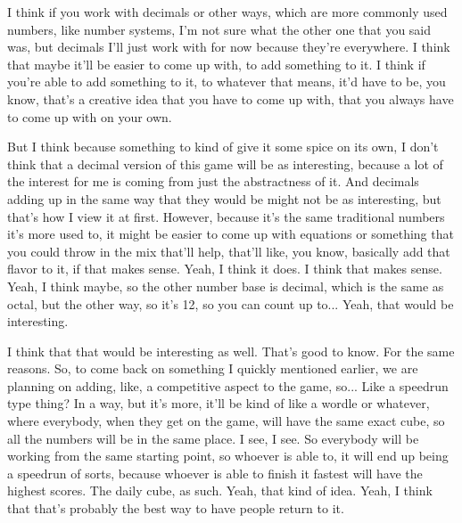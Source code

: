 \documentclass{article}
\begin{document}
I think if you work with decimals or other ways, which are more commonly used numbers, like
number systems, I'm not sure what the other one that you said was, but decimals I'll just work
with for now because they're everywhere. I think that maybe it'll be easier to come up with, to add
something to it. I think if you're able to add something to it, to whatever that means, it'd have to
be, you know, that's a creative idea that you have to come up with, that you always have to come
up with on your own.

But I think because something to kind of give it some spice on its own, I don't think that a decimal
version of this game will be as interesting, because a lot of the interest for me is coming from just
the abstractness of it. And decimals adding up in the same way that they would be might not be
as interesting, but that's how I view it at first. However, because it's the same traditional numbers
it's more used to, it might be easier to come up with equations or something that you could throw
in the mix that'll help, that'll like, you know, basically add that flavor to it, if that makes sense.
Yeah, I think it does. I think that makes sense. Yeah, I think maybe, so the other number base is
decimal, which is the same as octal, but the other way, so it's 12, so you can count up to... Yeah,
that would be interesting.

I think that that would be interesting as well. That's good to know. For the same reasons.
So, to come back on something I quickly mentioned earlier, we are planning on adding, like, a
competitive aspect to the game, so... Like a speedrun type thing? In a way, but it's more, it'll be
kind of like a wordle or whatever, where everybody, when they get on the game, will have the
same exact cube, so all the numbers will be in the same place. I see, I see. So everybody will be
working from the same starting point, so whoever is able to, it will end up being a speedrun of
sorts, because whoever is able to finish it fastest will have the highest scores.
The daily cube, as such. Yeah, that kind of idea. Yeah, I think that that's probably the best way to
have people return to it.
\end{document}
